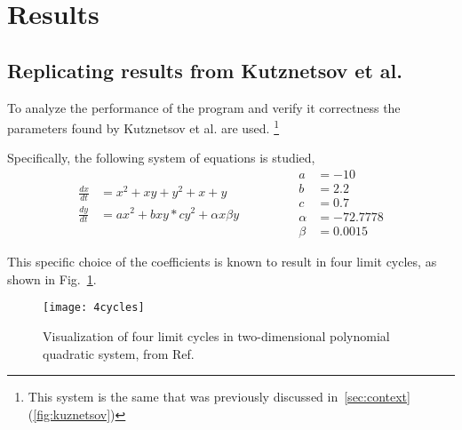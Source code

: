 
\section{Results}

\subsection{Replicating results from Kutznetsov et al.}

To analyze the performance of the program and verify it correctness the parameters found by Kutznetsov et al. \cite{kuznetsov_visualization_2013} are used. \footnote{This system is the same that was previously discussed in~\cref{sec:context} (\cref{fig:kuznetsov})}

Specifically, the following system of equations is studied, 
\begin{equation}%
    \label{eq:kuznetsov}
    \begin{split}
        \frac{dx}{dt} &= x^2 + xy + y^2 + x + y\\
        \frac{dy}{dt} &= ax^2 + bxy * cy^2 + \alpha x \beta y
    \end{split}
    \qquad \qquad
    \begin{split}
        a &= -10\\
        b &= 2.2\\
        c &= 0.7\\
        \alpha &= -72.7778\\
        \beta &= 0.0015
    \end{split}
\end{equation}

This specific choice of the coefficients is known to result in four limit cycles, as shown in Fig.~\cref{fig:kuznetsov2}.

\begin{figure}[H]
    \centering
    \texttt{[image: 4cycles]}
    \caption{Visualization of four limit cycles in two-dimensional polynomial quadratic system, from Ref.~\cite{kuznetsov_visualization_2013}
    }
    \label{fig:kuznetsov2}
\end{figure}

